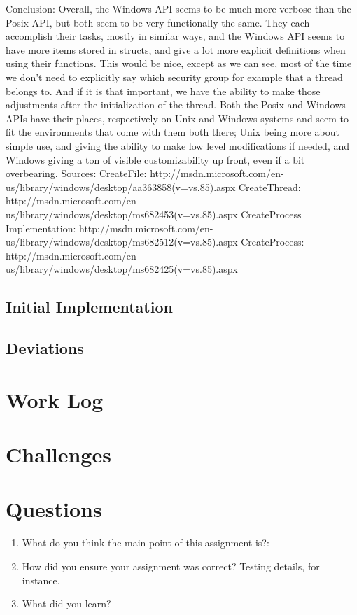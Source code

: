 \documentclass[fleqn,10pt,titlepage]{article}
\begin{document}
Conclusion:
Overall, the Windows API seems to be much more verbose than the Posix API, but both seem to be very functionally the same. They each accomplish their tasks, mostly in similar ways, and the Windows API seems to have more items stored in structs, and give a lot more explicit definitions when using their functions. This would be nice, except as we can see, most of the time we don’t need to explicitly say which security group for example that a thread belongs to. And if it is that important, we have the ability to make those adjustments after the initialization of the thread. Both the Posix and Windows APIs have their places, respectively on Unix and Windows systems and seem to fit the environments that come with them both there; Unix being more about simple use, and giving the ability to make low level modifications if needed, and Windows giving a ton of visible customizability up front, even if a bit overbearing.
Sources:
CreateFile: http://msdn.microsoft.com/en-us/library/windows/desktop/aa363858(v=vs.85).aspx
CreateThread: http://msdn.microsoft.com/en-us/library/windows/desktop/ms682453(v=vs.85).aspx
CreateProcess Implementation: http://msdn.microsoft.com/en-us/library/windows/desktop/ms682512(v=vs.85).aspx
CreateProcess: http://msdn.microsoft.com/en-us/library/windows/desktop/ms682425(v=vs.85).aspx

\subsection{Initial Implementation}
\begin{enumerate}
\end{enumerate}
\subsection{Deviations}
\clearpage

\section{Work Log}
\clearpage

\section{Challenges}
\begin{itemize}
\end{itemize}
\clearpage

\section{Questions}
\begin{enumerate}
\item What do you think the main point of this assignment is?: \\
\item How did you ensure your assignment was correct? Testing details, for instance. \\
\item What did you learn?  \\
\end{enumerate}
\end{document}
